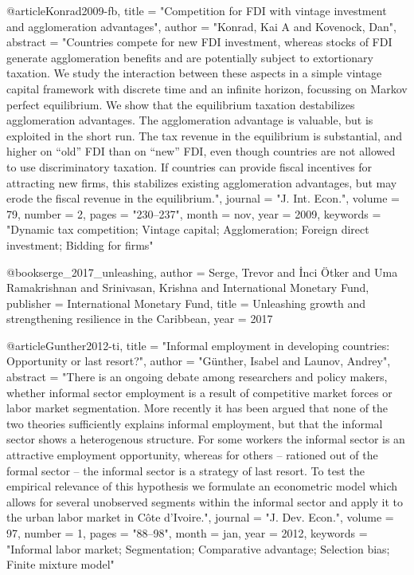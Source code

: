 {@article{Konrad2009-fb,
	title    = "Competition for {FDI} with vintage investment and agglomeration
	advantages",
	author   = "Konrad, Kai A and Kovenock, Dan",
	abstract = "Countries compete for new FDI investment, whereas stocks of FDI
	generate agglomeration benefits and are potentially subject to
	extortionary taxation. We study the interaction between these
	aspects in a simple vintage capital framework with discrete time
	and an infinite horizon, focussing on Markov perfect equilibrium.
	We show that the equilibrium taxation destabilizes agglomeration
	advantages. The agglomeration advantage is valuable, but is
	exploited in the short run. The tax revenue in the equilibrium is
	substantial, and higher on ``old'' FDI than on ``new'' FDI, even
	though countries are not allowed to use discriminatory taxation.
	If countries can provide fiscal incentives for attracting new
	firms, this stabilizes existing agglomeration advantages, but may
	erode the fiscal revenue in the equilibrium.",
	journal  = "J. Int. Econ.",
	volume   =  79,
	number   =  2,
	pages    = "230--237",
	month    =  nov,
	year     =  2009,
	keywords = "Dynamic tax competition; Vintage capital; Agglomeration; Foreign
	direct investment; Bidding for firms"
}

@book{serge_2017_unleashing,
	author = {Serge, Trevor and İnci Ötker and Uma Ramakrishnan and Srinivasan, Krishna and International Monetary Fund},
	publisher = {International Monetary Fund},
	title = {Unleashing growth and strengthening resilience in the Caribbean},
	year = {2017}
}



@article{Gunther2012-ti,
	title    = "Informal employment in developing countries: Opportunity or last
	resort?",
	author   = "G{\"u}nther, Isabel and Launov, Andrey",
	abstract = "There is an ongoing debate among researchers and policy makers,
	whether informal sector employment is a result of competitive
	market forces or labor market segmentation. More recently it has
	been argued that none of the two theories sufficiently explains
	informal employment, but that the informal sector shows a
	heterogenous structure. For some workers the informal sector is
	an attractive employment opportunity, whereas for others --
	rationed out of the formal sector -- the informal sector is a
	strategy of last resort. To test the empirical relevance of this
	hypothesis we formulate an econometric model which allows for
	several unobserved segments within the informal sector and apply
	it to the urban labor market in C{\^o}te d'Ivoire.",
	journal  = "J. Dev. Econ.",
	volume   =  97,
	number   =  1,
	pages    = "88--98",
	month    =  jan,
	year     =  2012,
	keywords = "Informal labor market; Segmentation; Comparative advantage;
	Selection bias; Finite mixture model"
}

}
